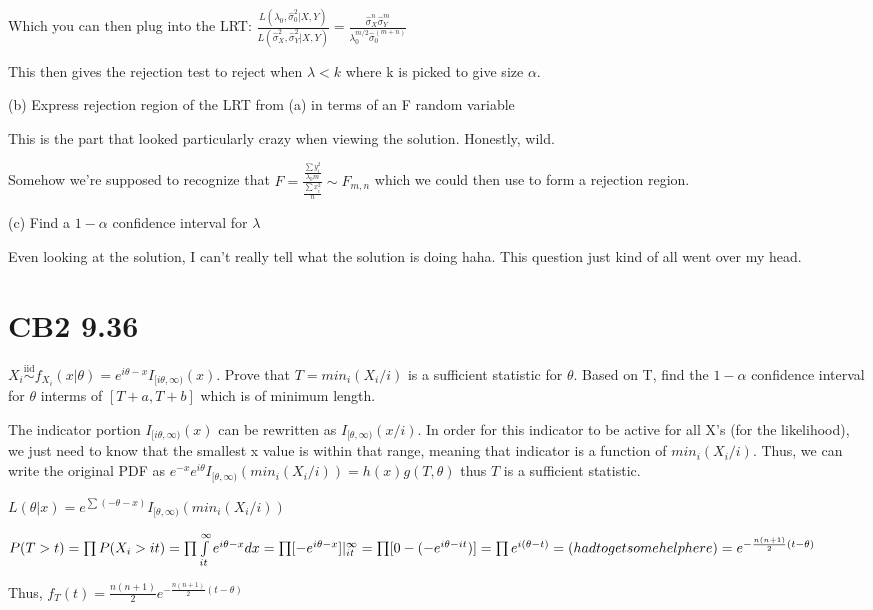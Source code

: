 \documentclass{article}
\let\Oldint=\int
\let\Oldsum=\sum
\let\Oldprod=\prod
\renewcommand{\int}{\Oldint\limits}
\renewcommand{\sum}{\Oldsum\limits}
\renewcommand{\prod}{\Oldprod\limits}
\newcommand{\iiddist}{\overset{\mathrm{iid}}{\sim}}
\begin{document}
Which you can then plug into the LRT: $\frac{L(\lambda_0, \hat{\sigma}^2_0|X,Y)}{L(\hat{\sigma}^2_X, \hat{\sigma}^2_Y|X,Y)} = \frac{\hat{\sigma}_X^n \hat{\sigma}_Y^m}{\lambda_0^{m/2} \hat{\sigma}_0^{(m+n)}}$

This then gives the rejection test to reject when $\lambda < k$ where k is picked to give size $\alpha$.

(b) Express rejection region of the LRT from (a) in terms of an F random variable

This is the part that looked particularly crazy when viewing the solution. Honestly, wild. 

Somehow we're supposed to recognize that $F = \frac{\frac{\sum y_i^2}{\lambda_0 m}}{\frac{\sum x_i^2}{n}} \sim F_{m,n}$ which we could then use to form a rejection region. 

(c) Find a $1-\alpha$ confidence interval for $\lambda$

Even looking at the solution, I can't really tell what the solution is doing haha. This question just kind of all went over my head. 

\section{CB2 9.36}

$X_i \iiddist f_{X_i}(x|\theta) = e^{i\theta - x}I_{[i\theta, \infty)}(x)$. Prove that $T = min_i(X_i / i)$ is a sufficient statistic for $\theta$. Based on T, find the $1-\alpha$ confidence interval for $\theta$ interms of $[T+a, T+b]$ which is of minimum length. 

The indicator portion $I_{[i\theta, \infty)}(x)$ can be rewritten as $I_{[\theta, \infty)}(x/i)$. In order for this indicator to be active for all X's (for the likelihood), we just need to know that the smallest x value is within that range, meaning that indicator is a function of $min_i(X_i/i)$. Thus, we can write the original PDF as $e^{-x}e^{i\theta}I_{[\theta, \infty)}(min_i(X_i/i)) = h(x)g(T, \theta)$ thus $T$ is a sufficient statistic. 

$L(\theta|x) = e^{\sum(-\theta - x)}I_{[\theta, \infty)}(min_i(X_i/i))$

$P(T > t) = \prod P(X_i > it) = \prod \int_{it}^{\infty}e^{i\theta - x}dx = \prod [-e^{i\theta-x}]|_{it}^{\infty} = \prod [0 - (-e^{i\theta - it})] = \prod e^{i(\theta-t)} = \text( had to get some help here ) = e^{-\frac{n(n+1)}{2}(t-\theta)}$

Thus, $f_T(t) = \frac{n(n+1)}{2}e^{-\frac{n(n+1)}{2}(t-\theta)}$
\end{document}
